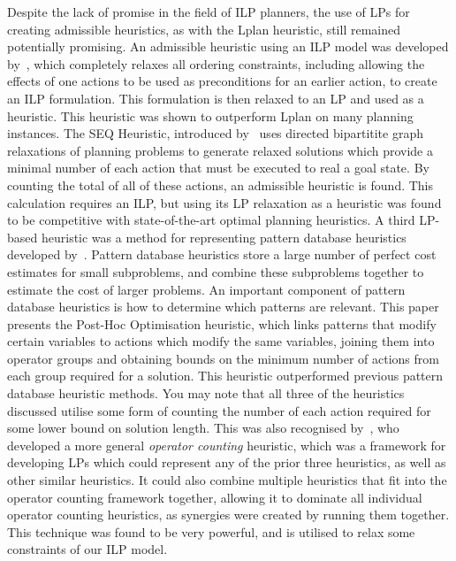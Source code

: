 Despite the lack of promise in the field of ILP planners, the use of LPs for creating admissible heuristics, as with the Lplan heuristic, still remained potentially promising. An admissible heuristic using an ILP model was developed by~\cite{VanDenBriel2007LpHeuristicPlanning}, which completely relaxes all ordering constraints, including allowing the effects of one actions to be used as preconditions for an earlier action, to create an ILP formulation. This formulation is then relaxed to an LP and used as a heuristic. This heuristic was shown to outperform Lplan on many planning instances. The SEQ Heuristic, introduced by~\cite{Bonet2013AdmissibleLPHeuristic} uses directed bipartitite graph relaxations of planning problems to generate relaxed solutions which provide a minimal number of each action that must be executed to real a goal state. By counting the total of all of these actions, an admissible heuristic is found. This calculation requires an ILP, but using its LP relaxation as a heuristic was found to be competitive with state-of-the-art optimal planning heuristics. A third LP-based heuristic was a method for representing pattern database heuristics developed by~\cite{Pommerening2013PatternDatabaseLPHeuristics}. Pattern database heuristics store a large number of perfect cost estimates for small subproblems, and combine these subproblems together to estimate the cost of larger problems. An important component of pattern database heuristics is how to determine which patterns are relevant. This paper presents the Post-Hoc Optimisation heuristic, which links patterns that modify certain variables to actions which modify the same variables, joining them into operator groups and obtaining bounds on the minimum number of actions from each group required for a solution. This heuristic outperformed previous pattern database heuristic methods. You may note that all three of the heuristics discussed utilise some form of counting the number of each action required for some lower bound on solution length. This was also recognised by~\cite{Pommerening2014LPHeuristics}, who developed a more general \textit{operator counting} heuristic, which was a framework for developing LPs which could represent any of the prior three heuristics, as well as other similar heuristics. It could also combine multiple heuristics that fit into the operator counting framework together, allowing it to dominate all individual operator counting heuristics, as synergies were created by running them together. This technique was found to be very powerful, and is utilised to relax some constraints of our ILP model.\\


